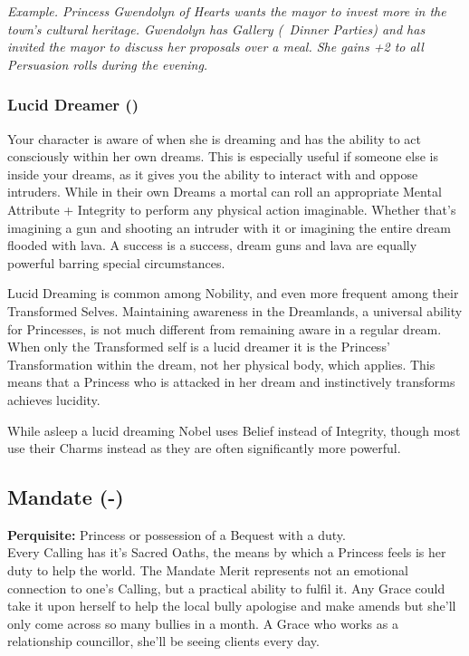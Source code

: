\textit{Example. Princess Gwendolyn of Hearts wants the mayor to invest more in the town's cultural heritage. Gwendolyn has Gallery (\textbullet\textbullet\, Dinner Parties) and has invited the mayor to discuss her proposals over a meal. She gains +2 to all Persuasion rolls during the evening.}


\subsubsection*{Lucid Dreamer (\textbullet\textbullet)}

Your character is aware of when she is dreaming and has the ability to act consciously within her own dreams. This is especially useful if someone else is inside your dreams, as it gives you the ability to interact with and oppose intruders. While in their own Dreams a mortal can roll an appropriate Mental Attribute + Integrity to perform any physical action imaginable. Whether that's imagining a gun and shooting an intruder with it or imagining the entire dream flooded with lava. A success is a success, dream guns and lava are equally powerful barring special circumstances. 

Lucid Dreaming is common among Nobility, and even more frequent among their Transformed Selves. Maintaining awareness in the Dreamlands, a universal ability for Princesses, is not much different from remaining aware in a regular dream. When only the Transformed self is a lucid dreamer it is the Princess' Transformation within the dream, not her physical body, which applies. This means that a Princess who is attacked in her dream and instinctively transforms achieves lucidity. 

While asleep a lucid dreaming Nobel uses Belief instead of Integrity, though most use their Charms instead as they are often significantly more powerful.

\subsection*{Mandate (\textbullet\nobreak\hspace{.16667em}-\nobreak\hspace{.16667em}\textbullet\textbullet\textbullet\textbullet\textbullet)}

\textbf{Perquisite:} Princess or possession of a Bequest with a duty. \\

\noindent Every Calling has it's Sacred Oaths, the means by which a Princess feels is her duty to help the world. The Mandate Merit represents not an emotional connection to one's Calling, but a practical ability to fulfil it. Any Grace could take it upon herself to help the local bully apologise and make amends but she'll only come across so many bullies in a month. A Grace who works as a relationship councillor, she'll be seeing clients every day. 

